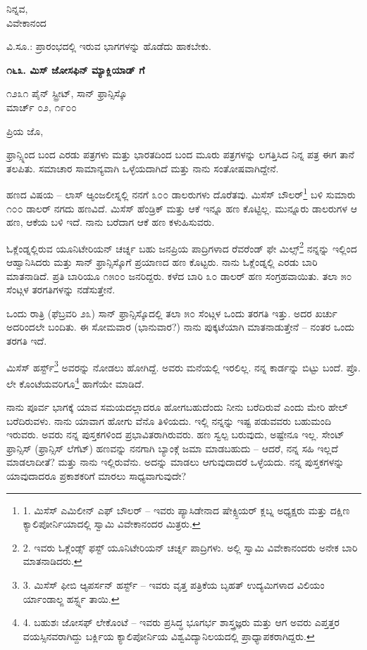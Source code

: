 \begin{flushright}
ನಿನ್ನವ,\\ವಿವೇಕಾನಂದ
\end{flushright}

ವಿ.ಸೂ.: ಪ್ರಾರಂಭದಲ್ಲಿ ಇರುವ ಭಾಗಗಳನ್ನು ಹೊಡೆದು ಹಾಕಬೇಕು.

\begin{center}
\textbf{೧೬೩. ಮಿಸ್ ಜೋಸಫಿನ್ ಮ್ಯಾಕ್ಲಿಯಾಡ್ ಗೆ}
\end{center}

\begin{flushright}
೧೨೩೧ ಪೈನ್ ಸ್ಟ್ರೀಟ್, ಸಾನ್ ಫ್ರಾನ್ಸಿಸ್ಕೊ\\ಮಾರ್ಚ್ ೦೨, ೧೯೦೦
\end{flushright}

ಪ್ರಿಯ ಜೊ,

ಫ್ರಾನ್ಸ್ನಿಂದ ಬಂದ ಎರಡು ಪತ್ರಗಳು ಮತ್ತು ಭಾರತದಿಂದ ಬಂದ ಮೂರು ಪತ್ರಗಳನ್ನು ಲಗತ್ತಿಸಿದ ನಿನ್ನ ಪತ್ರ ಈಗ ತಾನೆ ತಲಪಿತು. ಸಮಾಚಾರ ಸಾಮಾನ್ಯವಾಗಿ ಒಳ್ಳೆಯದಾಗಿದೆ ಮತ್ತು ನಾನು ಸಂತೋಷವಾಗಿದ್ದೇನೆ.

ಹಣದ ವಿಷಯ – ಲಾಸ್ ಆ್ಯಂಜಲೀಸ್ನಲ್ಲಿ ನನಗೆ ೩೦೦ ಡಾಲರುಗಳು ದೊರೆತವು. ಮಿಸೆಸ್ ಬೌಲರ್\footnote{1. ಮಿಸೆಸ್ ಎಮಿಲೀನ್ ಎಫ್ ಬೌಲರ್ – ಇವರು ಪ್ಯಾಸಿಡೇನಾದ ಷೇಕ್ಸ್ಪಿಯರ್ ಕ್ಲಬ್ನ ಅಧ್ಯಕ್ಷರು ಮತ್ತು ದಕ್ಷಿಣ ಕ್ಯಾಲಿಪೋರ್ನಿಯಾದಲ್ಲಿ ಸ್ವಾಮಿ ವಿವೇಕಾನಂದರ ಮಿತ್ರರು.} ಬಳಿ ಸುಮಾರು ೧೦೦ ಡಾಲರ್ ನಗದು ಹಣವಿದೆ. ಮಿಸೆಸ್ ಹೆಂಡ್ರಿಕ್ ಮತ್ತು ಆಕೆ ಇನ್ನೂ ಹಣ ಕೊಟ್ಟಿಲ್ಲ. ಮುನ್ನೂರು ಡಾಲರುಗಳ ಆ ಹಣ, ಆಕೆಯ ಬಳಿ ಇದೆ. ನಾನು ಬರೆದಾಗ ಆಕೆ ಹಣ ಕಳುಹಿಸುವರು.

ಓಕ್ಲೆಂಡ್ನಲ್ಲಿರುವ ಯೂನಿಟೇರಿಯನ್ ಚರ್ಚ್ನ ಬಹು ಜನಪ್ರಿಯ ಪಾದ್ರಿಗಳಾದ ರೆವರೆಂಡ್ ಫೇ ಮಿಲ್ಸ್\footnote{2. ಇವರು ಓಕ್ಲೆಂಡ್ಸ್ ಫಸ್ಟ್ ಯೂನಿಟೇರಿಯನ್ ಚರ್ಚ್ನ ಪಾದ್ರಿಗಳು. ಅಲ್ಲಿ ಸ್ವಾಮಿ ವಿವೇಕಾನಂದರು ಅನೇಕ ಬಾರಿ ಮಾತನಾಡಿದರು.} ನನ್ನನ್ನು ಇಲ್ಲಿಂದ ಆಹ್ವಾನಿಸಿದರು ಮತ್ತು ಸಾನ್ ಫ್ರಾನ್ಸಿಸ್ಕೊಗೆ ಪ್ರಯಾಣದ ಹಣ ಕೊಟ್ಟರು. ನಾನು ಓಕ್ಲೆಂಡ್ನಲ್ಲಿ ಎರಡು ಬಾರಿ ಮಾತನಾಡಿದೆ. ಪ್ರತಿ ಬಾರಿಯೂ ೧೫೦೦ ಜನರಿದ್ದರು. ಕಳೆದ ಬಾರಿ ೩೦ ಡಾಲರ್ ಹಣ ಸಂಗ್ರಹವಾಯಿತು. ತಲಾ ೫೦ ಸೆಂಟ್ಗಳ ತರಗತಿಗಳನ್ನು ನಡೆಸುತ್ತೇನೆ.

ಒಂದು ರಾತ್ರಿ (ಫೆಬ್ರವರಿ ೨೩) ಸಾನ್ ಫ್ರಾನ್ಸಿಸ್ಕೊದಲ್ಲಿ ತಲಾ ೫೦ ಸೆಂಟ್ಗಳ ಒಂದು ತರಗತಿ ಇತ್ತು. ಅದರ ಖರ್ಚು ಅದರಿಂದಲೇ ಬಂದಿತು. ಈ ಸೋಮವಾರ (ಭಾನುವಾರ?) ನಾನು ಪುಕ್ಕಟೆಯಾಗಿ ಮಾತನಾಡುತ್ತೇನೆ – ನಂತರ ಒಂದು ತರಗತಿ ಇದೆ.

ಮಿಸೆಸ್ ಹರ್ಸ್ಟ್\footnote{3. ಮಿಸೆಸ್ ಫೀಬಿ ಆ್ಯಪರ್ಸನ್ ಹರ್ಸ್ಟ್ – ಇವರು ವೃತ್ತ ಪತ್ರಿಕೆಯ ಬೃಹತ್ ಉದ್ಯಮಿಗಳಾದ ವಿಲಿಯಂ ರ್ಯಾಂಡಾಲ್ಙ ಹರ್ಸ್ಟ್ನ ತಾಯಿ.} ಅವರನ್ನು ನೋಡಲು ಹೋಗಿದ್ದೆ. ಅವರು ಮನೆಯಲ್ಲಿ ಇರಲಿಲ್ಲ. ನನ್ನ ಕಾರ್ಡನ್ನು ಬಿಟ್ಟು ಬಂದೆ. ಪ್ರೊ. ಲೇ ಕೊಂಟೆಯವರಿಗೂ\footnote{4. ಬಹುಶಃ ಜೋಸಫ್ ಲೇಕೊಂಟೆ – ಇವರು ಪ್ರಸಿದ್ಧ ಭೂಗರ್ಭ ಶಾಸ್ತ್ರಜ್ಞರು ಮತ್ತು ಆಗ ಅವರು ಎಪ್ತತ್ತರ ವಯಸ್ಸಿನವರಾಗಿದ್ದು ಬರ್ಕ್ಲಿಯ ಕ್ಯಾಲಿಪೋರ್ನಿಯ ವಿಶ್ವವಿದ್ಯಾನಿಲಯದಲ್ಲಿ ಪ್ರಾಧ್ಯಾಪಕರಾಗಿದ್ದರು.} ಹಾಗೆಯೇ ಮಾಡಿದೆ.

ನಾನು ಪೂರ್ವ ಭಾಗಕ್ಕೆ ಯಾವ ಸಮಯದಲ್ಲಾದರೂ ಹೋಗಬಹುದೆಂದು ನೀನು ಬರೆದಿರುವೆ ಎಂದು ಮೇರಿ ಹೇಲ್ ಬರೆದಿರುವಳು. ನಾನು ಯಾವಾಗ ಹೋಗು ವೆನೊ ತಿಳಿಯದು. ಇಲ್ಲಿ ನನ್ನನ್ನು ಇಷ್ಟ ಪಡುವವರು ಬಹುಮಂದಿ ಇರುವರು. ಅವರು ನನ್ನ ಪುಸ್ತಕಗಳಿಂದ ಪ್ರಭಾವಿತರಾಗಿರುವರು. ಹಣ ಸ್ವಲ್ಪ ಬರುವುದು, ಅಷ್ಟೇನೂ ಇಲ್ಲ. ಸೇಂಟ್ ಫ್ರಾನ್ಸಿಸ್ (ಫ್ರಾನ್ಸಿಸ್ ಲೆಗೆಟ್) ಹಣವನ್ನು ನನಗಾಗಿ ಬ್ಯಾಂಕ್ಗೆ ಜಮಾ ಮಾಡಬಹುದು – ಆದರೆ, ನನ್ನ ಸಹಿ ಇಲ್ಲದೆ ಮಾಡಲಾದೀತೆ? ಮತ್ತು ನಾನು ಇಲ್ಲಿರುವೆನು. ಅದನ್ನು ಮಾಡಲು ಆಗುವುದಾದರೆ ಒಳ್ಳೆಯದು. ನನ್ನ ಪುಸ್ತಕಗಳನ್ನು ಯಾವುದಾದರೂ ಪ್ರಕಾಶಕರಿಗೆ ಮಾರಲು ಸಾಧ್ಯವಾಗುವುದೇ?

